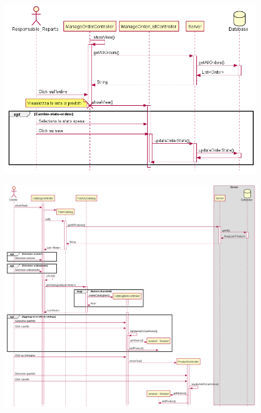 \documentclass[12pt, a4paper]{report}
\begin{document}
\begin{figure}[H]
  \centering
  \includegraphics[width=\textwidth]{sequence_controllo_spese.png}
\end{figure}

\begin{figure}[H]
  \centering
  \includegraphics[width=\textwidth]{sequence_effettua_spesa.png}
\end{figure}
\end{document}
